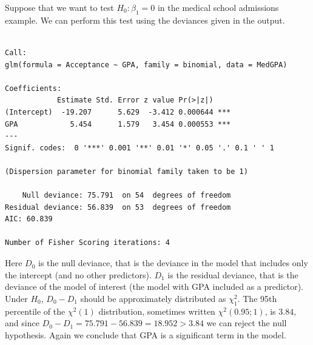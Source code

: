\documentclass[
  a4paper,
  DIV=11,
  numbers=noendperiod]{scrreprt}
\newenvironment{fbxSimple}[3]{\begin{tcolorbox}[enhanced, breakable,%
attach boxed title to top*={xshift=1.4pt},
boxed title style={boxrule=0.0mm, fuzzy shadow={1pt}{-1pt}{0mm}{0.1mm}{gray}, arc=.3em, rounded corners=east, sharp corners=west}, colframe=#1-color2, colbacktitle=#1-color1, colback = white, coltitle=black,  titlerule=0mm, toprule=0pt, bottomrule=.7pt, leftrule=.3em, rightrule=.7pt, outer arc=.3em,  	left=.5em, right=.5em, bottomtitle=1mm, toptitle=1mm,title=\textbf{#2}\hspace{0.5em}{#3}]}
{\end{tcolorbox}}
\begin{document}
\label{hypothesis-test-for-the-gpa-coefficient-in-the-model-for-medical-school-admissions-this-time-using-deviances}
\begin{fbxSimple}{Example}{Example 12: }{Hypothesis test for the GPA coefficient in the model for medical school admissions, this time using deviances}
\label{hypothesis-test-for-the-gpa-coefficient-in-the-model-for-medical-school-admissions-this-time-using-deviances}
Suppose that we want to test \(H_0: \beta_1=0\) in the medical school
admissions example. We can perform this test using the deviances given
in the output.

\begin{verbatim}

Call:
glm(formula = Acceptance ~ GPA, family = binomial, data = MedGPA)

Coefficients:
            Estimate Std. Error z value Pr(>|z|)    
(Intercept)  -19.207      5.629  -3.412 0.000644 ***
GPA            5.454      1.579   3.454 0.000553 ***
---
Signif. codes:  0 '***' 0.001 '**' 0.01 '*' 0.05 '.' 0.1 ' ' 1

(Dispersion parameter for binomial family taken to be 1)

    Null deviance: 75.791  on 54  degrees of freedom
Residual deviance: 56.839  on 53  degrees of freedom
AIC: 60.839

Number of Fisher Scoring iterations: 4
\end{verbatim}

Here \(D_0\) is the null deviance, that is the deviance in the model
that includes only the intercept (and no other predictors). \(D_1\) is
the residual deviance, that is the deviance of the model of interest
(the model with GPA included as a predictor). Under \(H_0\), \(D_0-D_1\)
should be approximately distributed as \(\chi^2_1\). The 95th percentile
of the \(\chi^2(1)\) distribution, sometimes written
\(\chi^2(0.95; 1)\), is \(3.84\), and since
\(D_0-D_1=75.791-56.839=18.952>3.84\) we can reject the null hypothesis.
Again we conclude that GPA is a significant term in the model.

\end{fbxSimple}
\end{document}
